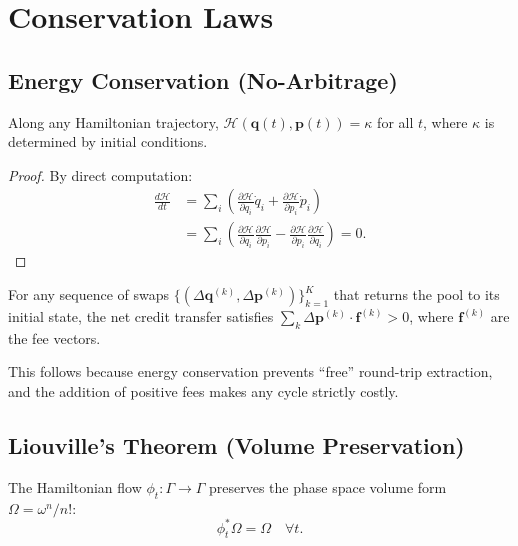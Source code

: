 \section{Conservation Laws}

\label{sec:conservation}

\subsection{Energy Conservation (No-Arbitrage)}

\begin{theorem}
\label{thm:energy}
Along any Hamiltonian trajectory, $\mathcal{H}(\bm{q}(t), \bm{p}(t)) = \kappa$ for all $t$, where $\kappa$ is determined by initial conditions.
\end{theorem}

\begin{proof}
By direct computation:
\begin{align}
\frac{d\mathcal{H}}{dt} &= \sum_i \left(\frac{\partial \mathcal{H}}{\partial q_i}\dot{q}_i + \frac{\partial \mathcal{H}}{\partial p_i}\dot{p}_i\right) \\
&= \sum_i \left(\frac{\partial \mathcal{H}}{\partial q_i}\frac{\partial \mathcal{H}}{\partial p_i} - \frac{\partial \mathcal{H}}{\partial p_i}\frac{\partial \mathcal{H}}{\partial q_i}\right) = 0.
\end{align}
\end{proof}

\begin{corollary}[No-Arbitrage]
For any sequence of swaps $\{(\Delta\bm{q}^{(k)}, \Delta\bm{p}^{(k)})\}_{k=1}^K$ that returns the pool to its initial state, the net credit transfer satisfies $\sum_k \Delta\bm{p}^{(k)} \cdot \bm{f}^{(k)} > 0$, where $\bm{f}^{(k)}$ are the fee vectors.
\end{corollary}

This follows because energy conservation prevents ``free'' round-trip extraction, and the addition of positive fees makes any cycle strictly costly.

\subsection{Liouville's Theorem (Volume Preservation)}

\begin{theorem}
\label{thm:liouville}
The Hamiltonian flow $\phi_t : \Gamma \to \Gamma$ preserves the phase space volume form $\Omega = \omega^n / n!$:
\begin{equation}
\phi_t^* \Omega = \Omega \quad \forall t.
\end{equation}
\end{theorem}

